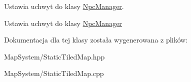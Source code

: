 Ustawia uchwyt do klasy \hyperlink{class_npc_manager}{Npc\-Manager}. 

Ustawia uchwyt do klasy \hyperlink{class_npc_manager}{Npc\-Manager} 

Dokumentacja dla tej klasy została wygenerowana z plików\-:\begin{DoxyCompactItemize}
\item 
Map\-System/Static\-Tiled\-Map.\-hpp\item 
Map\-System/Static\-Tiled\-Map.\-cpp\end{DoxyCompactItemize}
